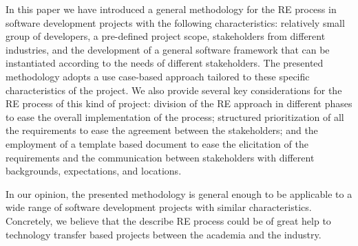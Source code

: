 In this paper we have introduced a general methodology for the 
RE process in software development projects
with the following characteristics: relatively small group of
developers, a pre-defined project scope, stakeholders from
different industries, and the development of a general software
framework that can be instantiated according to the needs of different 
stakeholders.  The presented methodology adopts a use case-based
approach tailored to these specific characteristics of the project.
We also provide several key considerations for the RE process of this kind of project: division of the RE
approach in different phases to ease the overall implementation of
the process; structured prioritization of all the requirements to
ease the agreement between the stakeholders; and the employment of
a template based document to ease the elicitation of the
requirements and the communication between stakeholders with
different backgrounds, expectations, and locations.

In our opinion, the presented methodology is general enough to be 
applicable to a wide range of software development projects with 
similar characteristics. Concretely, we believe that the describe
RE process could be of great help to technology transfer based
projects between the academia and the industry.

